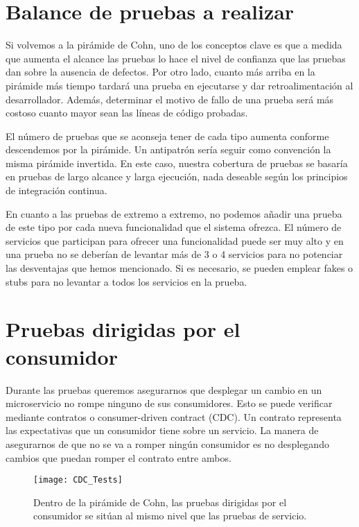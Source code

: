 \documentclass[11pt,a4paper]{article}
\begin{document}
\section{Balance de pruebas a realizar}

Si volvemos a la pirámide de Cohn, uno de los conceptos clave es que a medida que aumenta el alcance las pruebas lo hace el nivel de confianza que las pruebas dan sobre la ausencia de defectos. Por otro lado, cuanto más arriba en la pirámide más tiempo tardará una prueba en ejecutarse y dar retroalimentación al desarrollador. Además, determinar el motivo de fallo de una prueba será más costoso cuanto mayor sean las líneas de código probadas.

El número de pruebas que se aconseja tener de cada tipo aumenta conforme descendemos por la pirámide. Un antipatrón sería seguir como convención la misma pirámide invertida. En este caso, nuestra cobertura de pruebas se basaría en pruebas de largo alcance y larga ejecución, nada deseable según los principios de integración continua.

En cuanto a las pruebas de extremo a extremo, no podemos añadir una prueba de este tipo por cada nueva funcionalidad que el sistema ofrezca. El número de servicios que participan para ofrecer una funcionalidad puede ser muy alto y en una prueba no se deberían de levantar más de 3 o 4 servicios para no potenciar las desventajas que hemos mencionado. Si es necesario, se pueden emplear fakes o stubs para no levantar a todos los servicios en la prueba.

\section{Pruebas dirigidas por el consumidor}

Durante las pruebas queremos asegurarnos que desplegar un cambio en un microservicio no rompe ninguno de sus consumidores. Esto se puede verificar mediante contratos o consumer-driven contract (CDC). Un contrato representa las expectativas que un consumidor tiene sobre un servicio. La manera de asegurarnos de que no se va a romper ningún consumidor es no desplegando cambios que puedan romper el contrato entre ambos.

\begin{figure}[h]
\centering
\texttt{[image: CDC\_Tests]}
\caption{Dentro de la pirámide de Cohn, las pruebas dirigidas por el consumidor se sitúan al mismo nivel que las pruebas de servicio.}
\end{figure}
\end{document}
